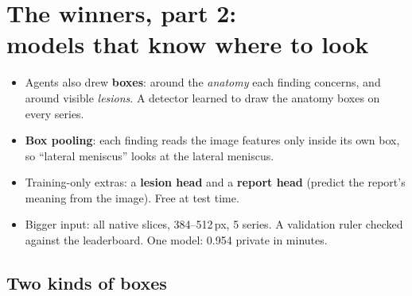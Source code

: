 \chapter[The winners, part 2: models]{The winners, part 2:\\ models that know where to look}
\label{ch:winmodels}

\begin{tldr}
\begin{itemize}
\item Agents also drew \textbf{boxes}: around the \emph{anatomy} each finding concerns, and around visible
      \emph{lesions}. A detector learned to draw the anatomy boxes on every series.
\item \textbf{Box pooling}: each finding reads the image features only inside its own box, so ``lateral meniscus'' looks
      at the lateral meniscus.
\item Training-only extras: a \textbf{lesion head} and a \textbf{report head} (predict the report's meaning from the
      image). Free at test time.
\item Bigger input: all native slices, 384--512\,px, 5 series. A validation ruler checked against the leaderboard.
      One model: 0.954 private in  minutes.
\end{itemize}
\end{tldr}

\section{Two kinds of boxes}

